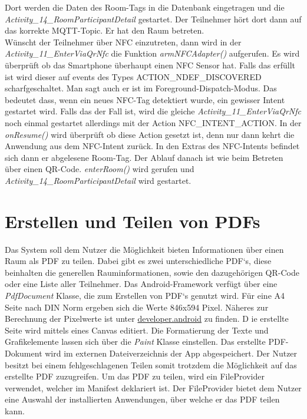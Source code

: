 Dort werden die Daten des Room-Tags in die Datenbank eingetragen und die \textit{Activity\_14\_RoomParticipantDetail} gestartet. Der Teilnehmer hört dort dann auf das korrekte MQTT-Topic. Er hat den Raum betreten.\\
Wünscht der Teilnehmer über NFC einzutreten, dann wird in der \textit{Activity\_11\_EnterViaQrNfc} die Funktion \textit{armNFCAdapter()} aufgerufen. Es wird überprüft ob das Smartphone überhaupt einen NFC Sensor hat.
Falls das erfüllt ist wird dieser auf events des Types ACTION\_NDEF\_DISCOVERED scharfgeschaltet. 
Man sagt auch er ist im Foreground-Dispatch-Modus.
Das bedeutet dass, wenn ein neues NFC-Tag detektiert wurde, ein gewisser Intent gestartet wird. 
Falls das der Fall ist, wird die gleiche \textit{Activity\_11\_EnterViaQrNfc} noch einmal gestartet allerdings mit der Action NFC\_INTENT\_ACTION. 
In der \textit{onResume()} wird überprüft ob diese Action gesetzt ist, denn nur dann kehrt die Anwendung aus dem NFC-Intent zurück.
In den Extras des NFC-Intents befindet sich dann er abgelesene Room-Tag. Der Ablauf danach ist wie beim Betreten über einen QR-Code. \textit{enterRoom()} wird gerufen und \textit{Activity\_14\_RoomParticipantDetail} wird gestartet.




\section{Erstellen und Teilen von PDFs}
\label{sec:PDF}
Das System soll dem Nutzer die Möglichkeit bieten Informationen über einen Raum als PDF zu teilen. 
Dabei gibt es zwei unterschiedliche PDF‘s, diese beinhalten die generellen Rauminformationen, sowie den dazugehörigen QR-Code oder eine Liste aller Teilnehmer.
Das Android-Framework  verfügt über eine \textit{PdfDocument} Klasse, die zum Erstellen von PDF‘s genutzt wird. 
Für eine A4 Seite nach DIN Norm ergeben sich die Werte 846x594 Pixel. Näheres zur Berechnung der Pixelwerte ist unter \href{https://developer.android.com/reference/android/graphics/pdf/PdfDocument.PageInfo}{developer.android} zu finden. D
ie erstellte Seite wird mittels eines Canvas editiert. 
Die Formatierung  der Texte und Grafikelemente lassen sich über die \textit{Paint} Klasse einstellen.
Das erstellte PDF-Dokument wird im externen Dateiverzeichnis der App abgespeichert. Der Nutzer besitzt bei einem fehlgeschlagenen Teilen somit trotzdem die Möglichkeit auf das erstellte PDF zuzugreifen.
Um das PDF zu teilen, wird ein FileProvider verwendet, welcher im Manifest deklariert ist.  Der FileProvider bietet dem Nutzer eine Auswahl der installierten Anwendungen, über welche er das PDF teilen kann.



